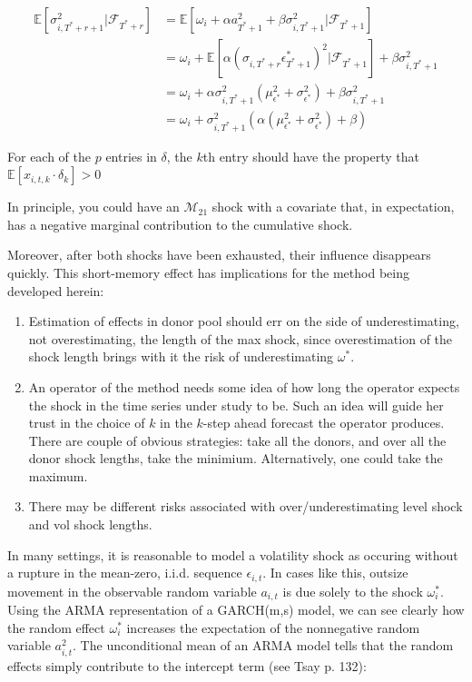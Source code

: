 \documentclass[11pt]{article}
\def\mc#1{\mathcal{#1}} %
\def\mc#1{\mathcal{#1}}
\theoremstyle{definition}
\begin{document}
\begin{align}
\mathbb{E}[ \sigma^{2}_{i,T^{*}+r+1} |\mathcal{F}_{T^{*}+r}] & = \mathbb{E}[\omega_{i} + \alpha a_{T^{*}+1}^{2} + \beta\sigma^{2}_{i,T^{*}+1} |\mathcal{F}_{T^{*}+1}] \\
& = \omega_{i} + \mathbb{E}[\alpha(\sigma_{i,T^{*}+r}\epsilon^{*}_{T^{*}+1})^{2} |\mathcal{F}_{T^{*}+1}] + \beta\sigma^{2}_{i,T^{*}+1} \\
& = \omega_{i} + \alpha\sigma^{2}_{i,T^{*}+1}(\mu^{2}_{\epsilon^{*}} + \sigma^{2}_{\epsilon^{*}}) + \beta\sigma^{2}_{i,T^{*}+1} \\
& = \omega_{i} + \sigma^{2}_{i,T^{*}+1}(\alpha(\mu^{2}_{\epsilon^{*}} + \sigma^{2}_{\epsilon^{*}}) + \beta)
\end{align}

 For each of the $p$ entries in $\delta$, the $k$th entry should have the property that $\mathbb{E}[ x_{i,t,k} \cdot \delta_{k} ] > 0$
 
 In principle, you could have an $\mc{M}_{21}$ shock with a covariate that, in expectation, has a negative marginal contribution to the cumulative shock.

Moreover, after both shocks have been exhausted, their influence disappears quickly.  This short-memory effect has implications for the method being developed herein:

\begin{enumerate}
\item Estimation of effects in donor pool should err on the side of underestimating, not overestimating, the length of the max shock, since overestimation of the shock length brings with it the risk of underestimating $\omega^{*}$.
\item An operator of the method needs some idea of how long the operator expects the shock in the time series under study to be.  Such an idea will guide her trust in the choice of $k$ in the $k$-step ahead forecast the operator produces.  There are couple of obvious strategies: take all the donors, and over all the donor shock lengths, take the minimium.  Alternatively, one could take the maximum.
\item There may be different risks associated with over/underestimating level shock and vol shock lengths.
\end{enumerate}

In many settings, it is reasonable to model a volatility shock as occuring without a rupture in the mean-zero, i.i.d. sequence $\epsilon_{i,t}$.  In cases like this, outsize movement in the observable random variable $a_{i,t}$ is due solely to the shock $\omega_{i}^{*}$.  Using the ARMA representation of a GARCH(m,s) model, we can see clearly how the random effect $\omega_{i}^{*}$ increases the expectation of the nonnegative random variable $a_{i,t}^{2}$.  The unconditional mean of an ARMA model tells that the random effects simply contribute to the intercept term (see Tsay p. 132):
\end{document}
